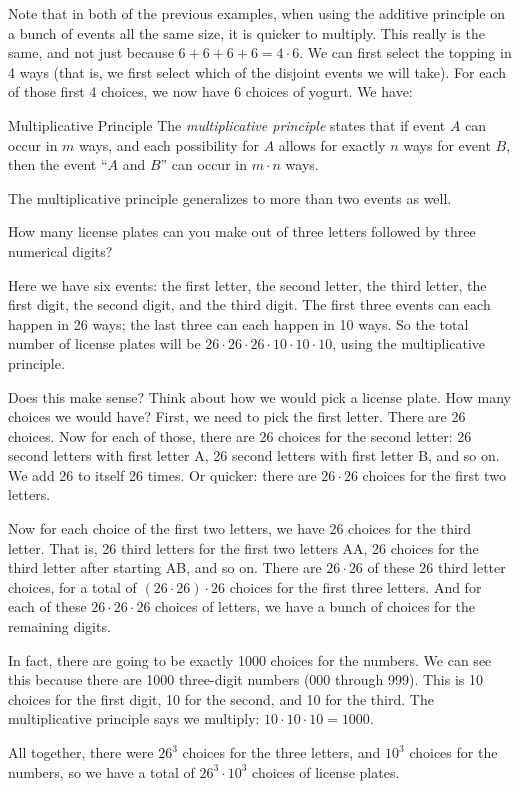 \documentclass[12pt]{article}
\begin{document}
Note that in both of the previous examples, when using the additive principle on a bunch of events all the same size, it is quicker to multiply.  This really is the same, and not just because $6 + 6 + 6 + 6 = 4\cdot 6$.  We can first select the topping in 4 ways (that is, we first select which of the disjoint events we will take).  For each of those first 4 choices, we now have 6 choices of yogurt.  We have:

\begin{defbox}{Multiplicative Principle}
  The {\em multiplicative principle} states that if event $A$ can occur in $m$ ways, and each possibility for $A$ allows for exactly $n$ ways for event $B$, then the event ``$A$ and $B$'' can occur in $m \cdot n$ ways.
\end{defbox}

The multiplicative principle generalizes to more than two events as well.

\begin{example}
  How many license plates can you make out of three letters followed by three numerical digits?

  \begin{solution}
    Here we have six events: the first letter, the second letter, the third letter, the first digit, the second digit, and the third digit.  The first three events can each happen in 26 ways; the last three can each happen in 10 ways.  So the total number of license plates will be $26\cdot 26\cdot 26 \cdot 10 \cdot 10 \cdot 10$, using the multiplicative principle.

    Does this make sense?  Think about how we would pick a license plate. How many choices we would have?  First, we need to pick the first letter.  There are 26 choices.  Now for each of those, there are 26 choices for the second letter: 26 second letters with first letter A, 26 second letters with first letter B, and so on.  We add 26 to itself 26 times.  Or quicker: there are $26 \cdot 26$ choices for the first two letters.

    Now for each choice of the first two letters, we have 26 choices for the third letter.  That is, 26 third letters for the first two letters AA, 26 choices for the third letter after starting AB, and so on.  There are $26 \cdot 26$ of these $26$ third letter choices, for a total of $(26\cdot26)\cdot 26$ choices for the first three letters.  And for each of these $26\cdot26\cdot26$ choices of letters, we have a bunch of choices for the remaining digits.

    In fact, there are going to be exactly 1000 choices for the numbers.  We can see this because there are 1000 three-digit numbers (000 through 999).  This is 10 choices for the first digit, 10 for the second, and 10 for the third.  The multiplicative principle says we multiply: $10\cdot 10 \cdot 10 = 1000$.

    All together, there were $26^3$ choices for the three letters, and $10^3$ choices for the numbers, so we have a total of $26^3 \cdot 10^3$ choices of license plates.
  \end{solution}

\end{example}
\end{document}
